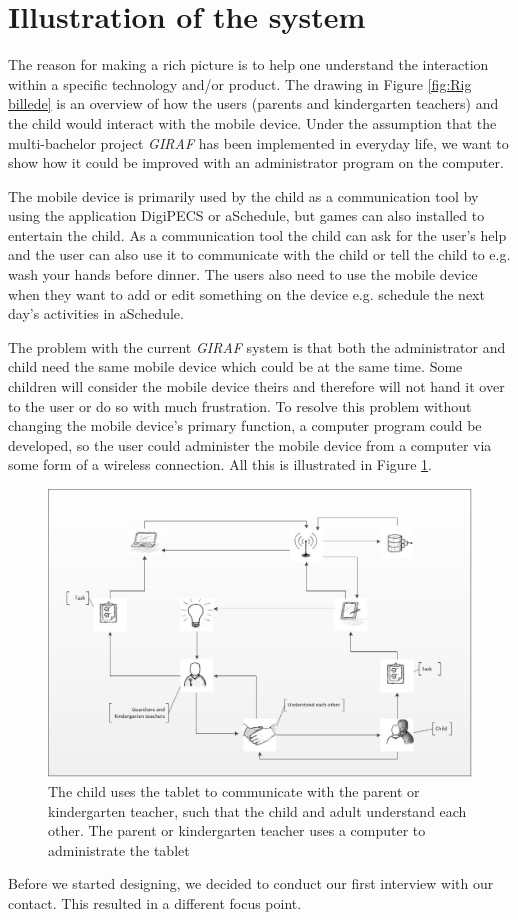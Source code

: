\section{Illustration of the system}
The reason for making a rich picture is to help one understand the interaction within a specific technology and/or product\cite{OOAD}. The drawing in Figure \vref{fig:Rig billede} is an overview of how the users (parents and kindergarten teachers) and the child would interact with the mobile device. Under the assumption that the multi-bachelor project \textit{GIRAF} has been implemented in everyday life, we want to show how it could be improved with an administrator program on the computer.

The mobile device is primarily used by the child as a communication tool by using the application DigiPECS or aSchedule, but games can also installed to entertain the child. As a communication tool the child can ask for the user's help and the user can also use it to communicate with the child or tell the child to e.g. wash your hands before dinner. 
The users also need to use the mobile device when they want to add or edit something on the device e.g. schedule the next day's activities in aSchedule.  
 
The problem with the current \textit{GIRAF} system is that both the administrator and child need the same mobile device which could be at the same time. Some children will consider the mobile device theirs and therefore will not hand it over to the user or do so with much frustration. To resolve this problem without changing the mobile device's primary function, a computer program could be developed, so the user could administer the mobile device from a computer via some form of a wireless connection. All this is illustrated in Figure \ref{fig:Rig billede}. 

\begin{figure}[!ht]
	\centering
		\includegraphics[width=1.00\textwidth]{img/Rig_billede2.jpg}
	\caption{The child uses the tablet to communicate with the parent or kindergarten teacher, such that the child and adult understand each other. The parent or kindergarten teacher uses a computer to administrate the tablet}
	\label{fig:Rig billede}
\end{figure}
\newpage

Before we started designing, we decided to conduct our first interview with our contact. This resulted in a different focus point.
    